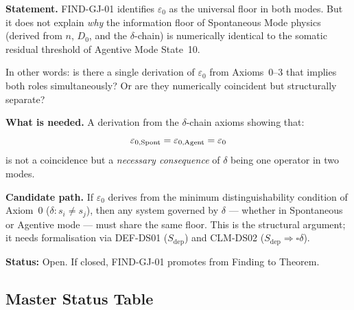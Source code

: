 \documentclass[12pt, a4paper]{article}
\providecommand{\eps}{\varepsilon_0}
\providecommand{\Sdep}{S_{\mathrm{dep}}}
\begin{document}

\begin{openqbox}[title={GAP-GJ-01: Why Is the Floor the
  Same? (Open)}]
\textbf{Statement.}
FIND-GJ-01 identifies $\eps$ as the universal floor in
both modes. But it does not explain \emph{why} the
information floor of Spontaneous Mode physics
(derived from $n$, $D_0$, and the $\delta$-chain)
is numerically identical to the somatic residual
threshold of Agentive Mode State~10.

In other words: is there a single derivation of $\eps$
from Axioms~0--3 that implies both roles simultaneously?
Or are they numerically coincident but structurally
separate?

\textbf{What is needed.}
A derivation from the $\delta$-chain axioms showing that:
\[
  \varepsilon_{0,\rm Spont} = \varepsilon_{0,\rm Agent}
  = \varepsilon_0
\]
is not a coincidence but a \emph{necessary consequence}
of $\delta$ being one operator in two modes.

\textbf{Candidate path.}
If $\eps$ derives from the minimum distinguishability
condition of Axiom~0 ($\delta: s_i \neq s_j$), then
any system governed by $\delta$ --- whether in
Spontaneous or Agentive mode --- must share the same
floor. This is the structural argument; it needs
formalisation via DEF-DS01 ($\Sdep$) and CLM-DS02
($\Sdep \Rightarrow \square\delta$).

\textbf{Status:} Open.
If closed, FIND-GJ-01 promotes from Finding to Theorem.
\end{openqbox}

\subsection{Master Status Table}

\end{document}
